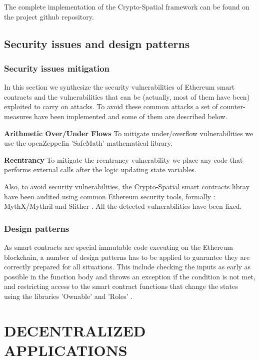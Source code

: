 \documentclass{isprs} %
\begin{document}
The complete implementation of the Crypto-Spatial framework can be found on the project github repository. 

\subsection{Security issues and design patterns}\label{sec:Security issues and design patterns}

\subsubsection{Security issues mitigation}\label{sec:Security issues mitigation}

In this section we synthesize the security vulnerabilities of Ethereum smart contracts and the vulnerabilities that can be (actually, most of them have been) exploited to carry on attacks. To avoid these common attacks a set of counter-measures have been implemented and some of them are described below.

\textbf{Arithmetic Over/Under Flows}  To mitigate under/overflow vulnerabilities we use the openZeppelin 'SafeMath' mathematical library. 

\textbf{Reentrancy} To mitigate the reentrancy vulnerability we place any code that performs external calls after the logic updating state variables. 

Also, to avoid security vulnerabilities, the Crypto-Spatial smart contracts libray have been audited using common Ethereum security tools, formally : MythX/Mythril \cite{mythx} and Slither \cite{slihter}. All the detected vulnerabilities have been fixed.

\subsubsection{Design patterns}\label{sec:Design patterns}

As smart contracts are special immutable code executing on the Ethereum blockchain, a number of design patterns has to be applied to guarantee they are correctly prepared for all situations. This include checking the inputs as early as possible in the function body and throws an exception if the condition is not met, and restricting access to the smart contract functions that change the states using the \cite{openzeppelin} libraries 'Ownable' and 'Roles' .

\newpage
\section{DECENTRALIZED APPLICATIONS}\label{sec:DECENTRALIZED APPLICATIONS}
\end{document}
